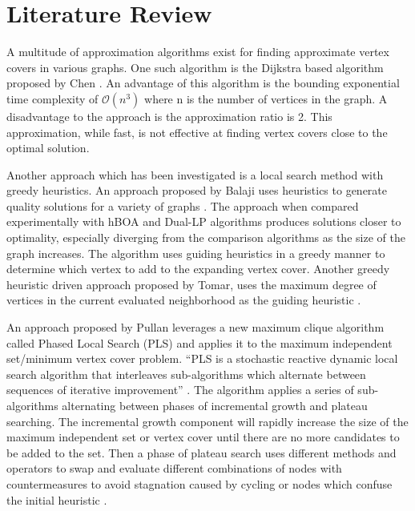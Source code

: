 \documentclass[conference,letterpaper]{IEEEtran}
\begin{document}
\section{Literature Review}
\par A multitude of approximation algorithms exist for finding approximate vertex covers in various graphs. One such algorithm is the Dijkstra based algorithm proposed by Chen \cite{chen16}. An advantage of this algorithm is the bounding exponential time complexity of $\mathcal{O}(n^{3})$ where n is the number of vertices in the graph. A disadvantage to the approach is the approximation ratio is 2. This approximation, while fast, is not effective at finding vertex covers close to the optimal solution.
\par Another approach which has been investigated is a local search method with greedy heuristics. An approach proposed by Balaji uses heuristics to generate quality solutions for a variety of graphs \cite{balaji13}. The approach when compared experimentally with hBOA and Dual-LP algorithms produces solutions closer to optimality, especially diverging from the comparison algorithms as the size of the graph increases. The algorithm uses guiding heuristics in a greedy manner to determine which vertex to add to the expanding vertex cover. Another greedy heuristic driven approach proposed by Tomar, uses the maximum degree of vertices in the current evaluated neighborhood as the guiding heuristic \cite{tomar14}.
\par An approach proposed by Pullan leverages a new maximum clique algorithm called Phased Local Search (PLS) \cite{pullan06} and applies it to the maximum independent set/minimum vertex cover problem. ``PLS is a stochastic reactive dynamic local search algorithm that interleaves sub-algorithms which alternate between sequences of iterative improvement'' \cite{pullan09}. The algorithm applies a series of sub-algorithms alternating between phases of incremental growth and plateau searching. The incremental growth component will rapidly increase the size of the maximum independent set or vertex cover until there are no more candidates to be added to the set. Then a phase of plateau search uses different methods and operators to swap and evaluate different combinations of nodes with countermeasures to avoid stagnation caused by cycling or nodes which confuse the initial heuristic \cite{pullan09}.
\end{document}
